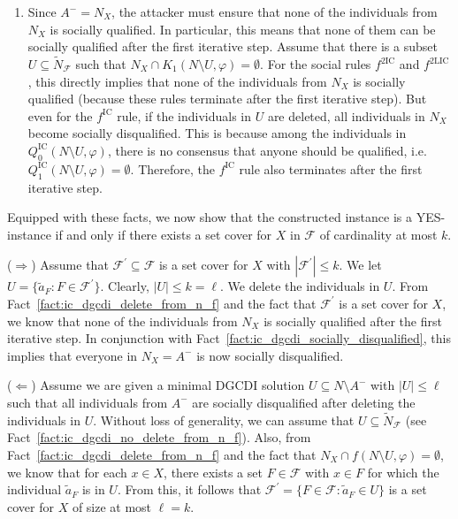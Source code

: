 \documentclass[
    12pt,               %
    a4paper,            %
    bibtotoc,           %
    pointlessnumbers,   %
    ngerman,            %
    titlepage,          %
    leqno,              %
    ]{scrarticle}       %
\newcommand\factref{Fact~\ref}
\begin{document}
\begin{Proof}
\begin{enumerate}[
    topsep=-4pt,
    leftmargin=*,
    itemindent=4.96em,
    label={\textit{Fact \ref*{thm:ic_dgcdi_npc}.\arabic*}:},
    ref={\ref*{thm:ic_dgcdi_npc}.\arabic*}
]
\item \label{fact:ic_dgcdi_socially_disqualified}
Since $A^- = N_X$, the attacker must ensure that none of the individuals from $N_X$ is socially qualified. In particular, this means that none of them can be socially qualified after the first iterative step. Assume that there is a subset $U \subseteq \tilde{N}_\mathcal{F}$ such that $N_X \cap K_1(N \setminus U, \varphi) = \emptyset$. For the social rules $f^{\text{2IC}}$ and $f^{\text{2LIC}}$, this directly implies that none of the individuals from $N_X$ is socially qualified (because these rules terminate after the first iterative step). But even for the $f^{\text{IC}}$ rule, if the individuals in $U$ are deleted, all individuals in $N_X$ become socially disqualified. This is because among the individuals in $Q^{\text{IC}}_0(N \setminus U, \varphi)$, there is no consensus that anyone should be qualified, i.e.\@ $Q^{\text{IC}}_1(N \setminus U, \varphi) = \emptyset$. Therefore, the $f^{\text{IC}}$ rule also terminates after the first iterative step.
\end{enumerate}



Equipped with these facts, we now show that the constructed instance is a YES-instance if and only if there exists a set cover for $X$ in $\mathcal{F}$ of cardinality at most $k$.

($\Rightarrow$) Assume that $\mathcal{F}^\prime \subseteq \mathcal{F}$ is a set cover for $X$ with $|\mathcal{F}^\prime| \leq k$. We let $U = \{ \tilde{a}_F : F \in \mathcal{F}^\prime \}$. Clearly, $|U| \leq k = \ell$. We delete the individuals in $U$. From \factref{fact:ic_dgcdi_delete_from_n_f} and the fact that $\mathcal{F}^\prime$ is a set cover for $X$, we know that none of the individuals from $N_X$ is socially qualified after the first iterative step. In conjunction with \factref{fact:ic_dgcdi_socially_disqualified}, this implies that everyone in $N_X = A^-$ is now socially disqualified.

($\Leftarrow$) Assume we are given a minimal DGCDI solution $U \subseteq N \setminus A^-$ with $|U| \leq \ell$ such that all individuals from $A^-$ are socially disqualified after deleting the individuals in $U$. Without loss of generality, we can assume that $U \subseteq \tilde{N}_\mathcal{F}$ (see \factref{fact:ic_dgcdi_no_delete_from_n_f}). Also, from \factref{fact:ic_dgcdi_delete_from_n_f} and the fact that $N_X \cap f(N \setminus U, \varphi) = \emptyset$, we know that for each $x \in X$, there exists a set $F \in \mathcal{F}$ with $x \in F$ for which the individual $\tilde{a}_F$ is in $U$. From this, it follows that $\mathcal{F}^\prime = \{ F \in \mathcal{F} : \tilde{a}_F \in U \}$ is a set cover for $X$ of size at most $\ell = k$.
\end{Proof}
\end{document}
